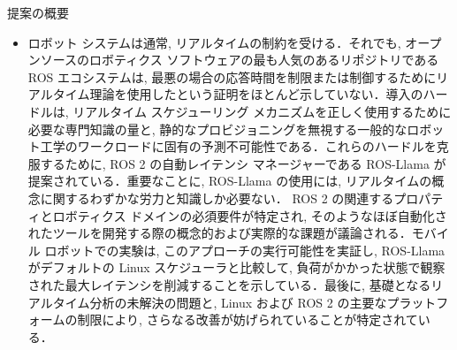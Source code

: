 
\begin{frame}{提案の概要}
    \begin{itemize}
        \item  ロボット システムは通常, リアルタイムの制約を受ける．それでも, オープンソースのロボティクス ソフトウェアの最も人気のあるリポジトリである ROS エコシステムは, 最悪の場合の応答時間を制限または制御するためにリアルタイム理論を使用したという証明をほとんど示していない．導入のハードルは, リアルタイム スケジューリング メカニズムを正しく使用するために必要な専門知識の量と, 静的なプロビジョニングを無視する一般的なロボット工学のワークロードに固有の予測不可能性である．これらのハードルを克服するために, ROS 2 の自動レイテンシ マネージャーである ROS-Llama が提案されている．重要なことに, ROS-Llama の使用には, リアルタイムの概念に関するわずかな労力と知識しか必要ない． ROS 2 の関連するプロパティとロボティクス ドメインの必須要件が特定され, そのようなほぼ自動化されたツールを開発する際の概念的および実際的な課題が議論される．モバイル ロボットでの実験は, このアプローチの実行可能性を実証し, ROS-Llama がデフォルトの Linux スケジューラと比較して, 負荷がかかった状態で観察された最大レイテンシを削減することを示している．最後に, 基礎となるリアルタイム分析の未解決の問題と, Linux および ROS 2 の主要なプラットフォームの制限により, さらなる改善が妨げられていることが特定されている．
    \end{itemize}
\end{frame}
